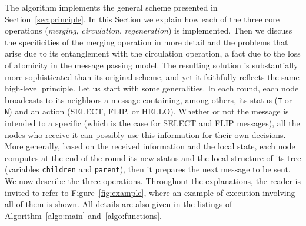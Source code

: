 \documentclass[twocolumn]{article}
\begin{document}
The algorithm implements the general scheme presented in
Section~\ref{sec:principle}. In this Section we explain how each of
the three core operations ({\em merging}, {\em circulation}, {\em
  regeneration}) is implemented. Then we discuss the specificities of
the merging operation in more detail and the problems that arise due
to its entanglement with the circulation operation, a fact due to the
loss of atomicity in the message passing model. The resulting solution
is substantially more sophisticated than its original scheme, and yet
it faithfully reflects the same high-level principle. Let us start
with some generalities. In each round, each node broadcasts to its
neighbors a message containing, among others, its status ({\tt T} or
{\tt N}) and an action (SELECT, FLIP, or HELLO). Whether or not the
message is intended to a specific  (which is the case for
SELECT and FLIP messages), all the nodes who receive it can possibly
use this information for their own decisions. More generally, based on
the received information and the local state, each node computes at
the end of the round its new status and the local structure of its
tree (variables \texttt{children} and \texttt{parent}), then it
prepares the next message to be sent. We now describe the three
operations. Throughout the explanations, the reader is invited to
refer to Figure~\ref{fig:example}, where an example of execution
involving all of them is shown. All details are also given in the
listings of Algorithm~\ref{algo:main} and~\ref{algo:functions}.
\end{document}
